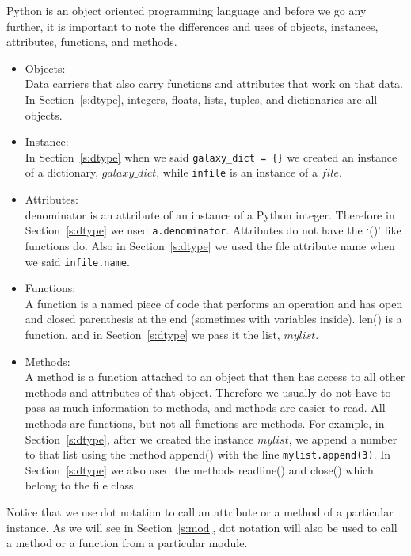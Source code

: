 Python is an object oriented programming language and before we go any
further, it is important to note the differences and uses of objects,
instances, attributes, functions, and methods.
\begin{itemize}
\item Objects: \\
  Data carriers that also carry functions and attributes that work on
  that data.  In Section~\ref{s:dtype}, integers, floats, lists,
  tuples, and dictionaries are all objects.
\item Instance: \\
  In Section~\ref{s:dtype} when we said \texttt{galaxy\_dict = \{\}}
  we created an instance of a dictionary, $galaxy\_dict$, while
  \texttt{infile} is an instance of a $file$.
\item Attributes: \\
  {\sf \small denominator} is an attribute of an instance of a Python
  integer.  Therefore in Section~\ref{s:dtype} we used
  \texttt{a.denominator}.  Attributes do not have the `()' like
  functions do.  Also in Section~\ref{s:dtype} we used the file
  attribute {\sf\small name} when we said \texttt{infile.name}.
\item Functions: \\
  A function is a named piece of code that performs an operation and
  has open and closed parenthesis at the end (sometimes with variables
  inside).  {\sf \small len()} is a function, and in
  Section~\ref{s:dtype} we pass it the list, $mylist$.
\item Methods: \\
  A method is a function attached to an object that then has access to
  all other methods and attributes of that object.  Therefore we
  usually do not have to pass as much information to methods, and
  methods are easier to read.  All methods are functions, but not all
  functions are methods.  For example, in Section~\ref{s:dtype}, after
  we created the instance $mylist$, we append a number to that list
  using the method {\sf\small append()} with the line
  \texttt{mylist.append(3)}.  In Section~\ref{s:dtype} we also used
  the methods {\sf\small readline()} and {\sf\small close()} which
  belong to the file class.
\end{itemize}
Notice that we use dot notation to call an attribute or a method of a
particular instance.  As we will see in Section~\ref{s:mod}, dot
notation will also be used to call a method or a function from a
particular module.

